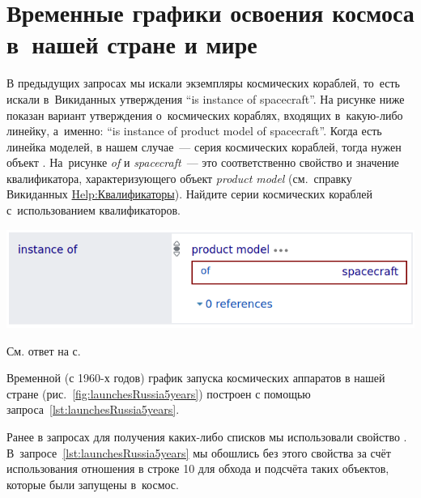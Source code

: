 \section{Временные графики освоения космоса в~нашей стране и мире}


\begin{marginfigure}[0\baselineskip]
    \MarginQuestion 
    В предыдущих запросах мы искали экземпляры космических кораблей, 
    то~есть искали в~Викиданных утверждения ``is instance of spacecraft''. 
    На рисунке ниже показан вариант утверждения 
    о~космических кораблях, входящих в~какую-либо линейку, а~именно: 
    ``is instance of product model of spacecraft''. 
    Когда есть линейка моделей, в нашем случае~--- серия космических кораблей, 
    тогда нужен объект . 
    На~рисунке \emph{of} и \emph{spacecraft}~--- 
    это соответственно свойство и значение квалификатора, характеризующего объект \emph{product model} 
    (см.~справку Викиданных \href{https://www.wikidata.org/?curid=16567549}{Help:Квалификаторы}). 
    Найдите серии космических кораблей с~использованием квалификаторов. 

    \vspace{3pt}
	\includegraphics[width=0.8\linewidth]{graphics/chapter/spacecraft_space_station/is_product_model_red.png}

    См. ответ на с.~\pageref{answer:product_model}\\
    \label{question:product_model}
\end{marginfigure}


Временной (с 1960-х годов) 
график запуска космических аппаратов в нашей стране (рис.~\ref{fig:launchesRussia5years}) 
построен с помощью запроса~\ref{lst:launchesRussia5years}.%

Ранее в запросах для получения каких-либо списков мы использовали свойство . 
В~запросе~\ref{lst:launchesRussia5years} мы обошлись без этого свойства за счёт использования отношения 
 в строке 10 
для обхода и подсчёта таких объектов, которые были запущены в~космос.  

